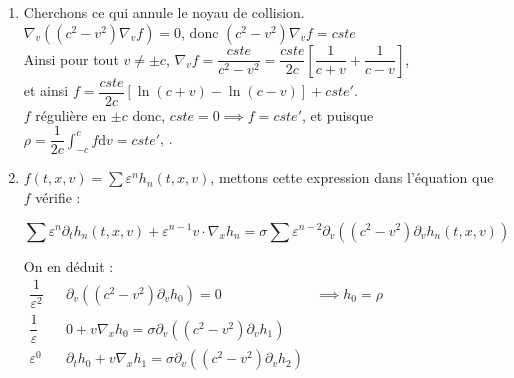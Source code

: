 \documentclass[12pt,a4paper]{article}
\begin{document}
\begin{sol}
\begin{enumerate}
		\item \begin{minipage}[t]{18cm}
			Cherchons ce qui annule le noyau de collision.\\
		
		$\nabla_v \left((c^2-v^2)\nabla_v f\right) = 0$, donc $(c^2-v^2)\nabla_v f = cste$\\
		Ainsi pour tout $v \not = \pm c$, $\nabla_v f = \dfrac{cste}{c^2-v^2} = \dfrac{cste}{2c}\left[\dfrac1{c+v}+\dfrac1{c-v}\right]$,\\
		et ainsi $f = \dfrac{cste}{2c}\left[\ln\left(c+v\right)-\ln(c-v)\right]+cste'$.\\
		$f$ régulière en $\pm c$ donc, $cste = 0 \implies f = cste'$, et puisque $\rho = \dfrac1{2c}\displaystyle\int_{-c}^c f\mathrm dv = cste'$, .
		\end{minipage}
		
		\item \begin{minipage}[t]{18cm}
			$f(t,x,v) = \displaystyle\sum\varepsilon^nh_n(t,x,v)$, mettons cette expression dans l'équation que $f$ vérifie : 

			\[
			\displaystyle\sum \varepsilon^n \partial_th_n(t,x,v) + \varepsilon^{n-1}v \cdot \nabla_x h_n = \sigma\sum \varepsilon^{n-2}\partial_v\left((c^2-v^2)\partial_v h_n(t,x,v)\right)
			\]
			
			On en déduit : \\
			
			$\begin{aligned}
				\dfrac1{\varepsilon^2} && \partial_v\left((c^2-v^2)\partial_v h_0\right) = 0 & \implies h_0 = \rho \\
				\dfrac1{\varepsilon} && 0+v\nabla_x h_0 = \sigma\partial_v\left((c^2-v^2)\partial_v h_1\right)\\
				\varepsilon^0 && \partial_t h_0+ v\nabla_x h_1 = \sigma\partial_v\left((c^2-v^2)\partial_vh_2\right)
			\end{aligned}$\\
			

\end{minipage}
\end{enumerate}
\end{sol}
\end{document}
